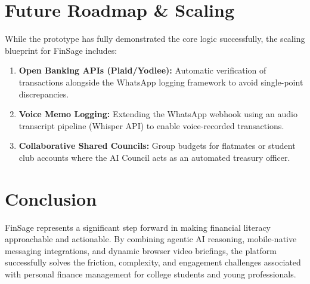 \documentclass[11pt,a4paper]{article}
\begin{document}
\section{Future Roadmap \& Scaling}
While the prototype has fully demonstrated the core logic successfully, the scaling blueprint for FinSage includes:
\begin{enumerate}
    \item \textbf{Open Banking APIs (Plaid/Yodlee):} Automatic verification of transactions alongside the WhatsApp logging framework to avoid single-point discrepancies.
    \item \textbf{Voice Memo Logging:} Extending the WhatsApp webhook using an audio transcript pipeline (Whisper API) to enable voice-recorded transactions.
    \item \textbf{Collaborative Shared Councils:} Group budgets for flatmates or student club accounts where the AI Council acts as an automated treasury officer.
\end{enumerate}

\section{Conclusion}
FinSage represents a significant step forward in making financial literacy approachable and actionable. By combining agentic AI reasoning, mobile-native messaging integrations, and dynamic browser video briefings, the platform successfully solves the friction, complexity, and engagement challenges associated with personal finance management for college students and young professionals.
\end{document}
